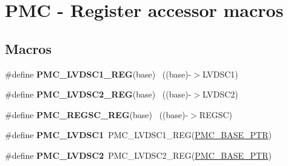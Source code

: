 \hypertarget{group___p_m_c___register___accessor___macros}{}\section{P\+M\+C -\/ Register accessor macros}
\label{group___p_m_c___register___accessor___macros}
\subsection*{Macros}
\begin{DoxyCompactItemize}
\item 
\hypertarget{group___p_m_c___register___accessor___macros_ga2fe280fb8b910471c6a1308e8507dd25}{}\#define {\bfseries P\+M\+C\+\_\+\+L\+V\+D\+S\+C1\+\_\+\+R\+E\+G}(base)                                      ~((base)-\/$>$L\+V\+D\+S\+C1)\label{group___p_m_c___register___accessor___macros_ga2fe280fb8b910471c6a1308e8507dd25}

\item 
\hypertarget{group___p_m_c___register___accessor___macros_ga4df6ab8710ac0dd4d7dd3a316de354c8}{}\#define {\bfseries P\+M\+C\+\_\+\+L\+V\+D\+S\+C2\+\_\+\+R\+E\+G}(base)                                      ~((base)-\/$>$L\+V\+D\+S\+C2)\label{group___p_m_c___register___accessor___macros_ga4df6ab8710ac0dd4d7dd3a316de354c8}

\item 
\hypertarget{group___p_m_c___register___accessor___macros_gababe9178e390666706c6a7f23b1dccb2}{}\#define {\bfseries P\+M\+C\+\_\+\+R\+E\+G\+S\+C\+\_\+\+R\+E\+G}(base)                                        ~((base)-\/$>$R\+E\+G\+S\+C)\label{group___p_m_c___register___accessor___macros_gababe9178e390666706c6a7f23b1dccb2}

\item 
\hypertarget{group___p_m_c___register___accessor___macros_gae9e90b7b2d3c4f5e0950d074fecb2798}{}\#define {\bfseries P\+M\+C\+\_\+\+L\+V\+D\+S\+C1}~P\+M\+C\+\_\+\+L\+V\+D\+S\+C1\+\_\+\+R\+E\+G(\hyperlink{group___p_m_c___peripheral_gaf32df9f1096263f10a5e8978a338b2ac}{P\+M\+C\+\_\+\+B\+A\+S\+E\+\_\+\+P\+T\+R})\label{group___p_m_c___register___accessor___macros_gae9e90b7b2d3c4f5e0950d074fecb2798}

\item 
\hypertarget{group___p_m_c___register___accessor___macros_ga921b48d20e5bc7e7353ac2f59c8135ba}{}\#define {\bfseries P\+M\+C\+\_\+\+L\+V\+D\+S\+C2}~P\+M\+C\+\_\+\+L\+V\+D\+S\+C2\+\_\+\+R\+E\+G(\hyperlink{group___p_m_c___peripheral_gaf32df9f1096263f10a5e8978a338b2ac}{P\+M\+C\+\_\+\+B\+A\+S\+E\+\_\+\+P\+T\+R})\label{group___p_m_c___register___accessor___macros_ga921b48d20e5bc7e7353ac2f59c8135ba}


\end{DoxyCompactItemize}
